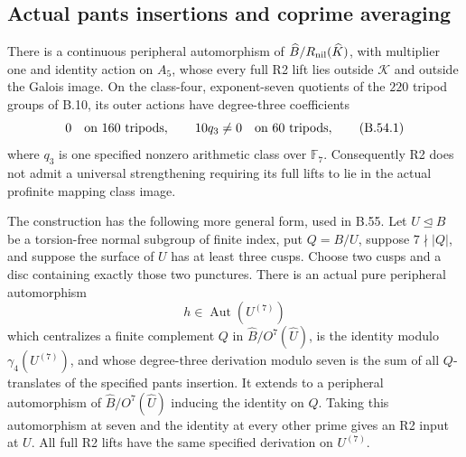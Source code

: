 \subsection*{Actual pants insertions and coprime averaging}

There is a continuous peripheral automorphism of
$\widehat B/R_{\rm nil}(\widehat K)$, with multiplier one and
identity action on $A_5$, whose every full R2 lift lies outside
$\mathcal K$ and outside the Galois image. On the class-four,
exponent-seven quotients of the $220$ tripod groups of B.10,
its outer actions have degree-three coefficients
\[
       0\quad\hbox{on }160\hbox{ tripods},\qquad
       10q_3\ne0\quad\hbox{on }60\hbox{ tripods},             \tag{B.54.1}
\]
where $q_3$ is one specified nonzero arithmetic class over
$\mathbb F_7$. Consequently R2 does not admit a universal
strengthening requiring its full lifts to lie in the actual
profinite mapping class image.

The construction has the following more general form, used in
B.55. Let $U\trianglelefteq B$ be a torsion-free normal subgroup
of finite index, put $Q=B/U$, suppose $7\nmid |Q|$, and suppose
the surface of $U$ has at least three cusps. Choose two cusps
and a disc containing exactly those two punctures. There is
an actual pure peripheral automorphism
\[
 h\in\operatorname{Aut}(U^{(7)})
\]
which centralizes a finite complement $Q$ in
$\widehat B/O^7(\widehat U)$, is the identity modulo
$\gamma_4(U^{(7)})$, and whose degree-three derivation modulo
seven is the sum of all $Q$-translates of the specified pants
insertion. It extends to a peripheral automorphism of
$\widehat B/O^7(\widehat U)$ inducing the identity on $Q$.
Taking this automorphism at seven and the identity at every
other prime gives an R2 input at $U$. All full R2 lifts have
the same specified derivation on $U^{(7)}$.

